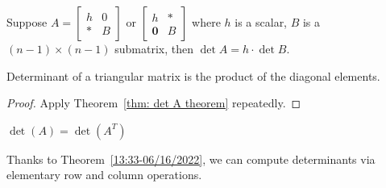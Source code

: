 \documentclass{beamer}
\theoremstyle{definition}
\theoremstyle{remark}
\begin{document}
\begin{frame}[t]
\begin{theorem}\label{thm: det A theorem}
Suppose $A=\begin{bmatrix}
h&0\\
*&B
\end{bmatrix}$ or $\begin{bmatrix}
h&*\\
\mathbf 0&B
\end{bmatrix}$ where $h$ is a scalar, $B$ is a $(n-1)\times(n-1)$ submatrix, then $\det A=h\cdot\det B$.
\pause
\begin{center}
\end{center}
\end{theorem}
\end{frame}

\begin{frame}[t]
\begin{corollary}
Determinant of a triangular matrix is the product of the diagonal elements.
\end{corollary}
\pause
\begin{proof}
Apply Theorem~\ref{thm: det A theorem} repeatedly.
\end{proof}
\pause
\begin{theorem}\label{13:33-06/16/2022}
$\det(A)=\det(A^T)$
\end{theorem}
\pause
Thanks to Theorem~\ref{13:33-06/16/2022}, we can compute determinants via elementary row and column operations.
\end{frame}
\end{document}
